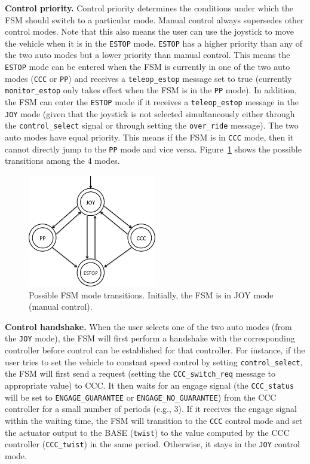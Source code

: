 \noindent
{\bf Control priority.}
Control priority determines the conditions under which the FSM should switch to a particular mode. 
Manual control always supersedes other control modes. Note that this also means the user can use the joystick to move the vehicle
when it is in the \texttt{ESTOP} mode. 
\texttt{ESTOP} has a higher priority than any of the two auto modes but a lower priority than manual control. 
This means the \texttt{ESTOP} mode can be entered when the FSM is currently in one of the two auto modes (\texttt{CCC} or \texttt{PP}) and 
receives a \texttt{teleop\_estop} message set to true (currently \texttt{monitor\_estop} only takes effect when the FSM is in the \texttt{PP} mode).
In addition, the FSM can enter the \texttt{ESTOP} mode if it receives a \texttt{teleop\_estop} message in the \texttt{JOY} mode
(given that the joystick is not selected simultaneously either through the \texttt{control\_select} signal or through setting the 
\texttt{over\_ride} message). 
The two auto modes have equal priority. This means if the FSM is in \texttt{CCC} mode, then it cannot directly jump to the \texttt{PP} mode 
and vice versa. Figure~\ref{fig:fsm_mode} shows the possible transitions among the 4 modes. 

\begin{figure}[ht]
  \centering
  \includegraphics[width=0.5\textwidth]{figures/fsm_mode.jpg}
  \caption{Possible FSM mode transitions. Initially, the FSM is in JOY mode (manual control).}
  \label{fig:fsm_mode}
\end{figure}

\noindent
{\bf Control handshake.}
When the user selects one of the two auto modes (from the \texttt{JOY} mode), 
the FSM will first perform a handshake with the corresponding controller before control can be established for that controller. 
For instance, if the user tries to set the vehicle to constant speed control by setting \texttt{control\_select}, 
the FSM will first send a request (setting the \texttt{CCC\_switch\_req} message to appropriate value) to CCC. 
It then waits for an engage signal (the \texttt{CCC\_status} will be set to \texttt{ENGAGE\_GUARANTEE} or 
\texttt{ENGAGE\_NO\_GUARANTEE}) from the CCC controller for a small number of periods (e.g., $3$). 
If it receives the engage signal within the waiting time, the FSM will transition to the \texttt{CCC} control mode and set the 
actuator output to the BASE (\texttt{twist}) to the value computed by the CCC controller (\texttt{CCC\_twist}) in the same period. 
Otherwise, it stays in the \texttt{JOY} control mode. 
